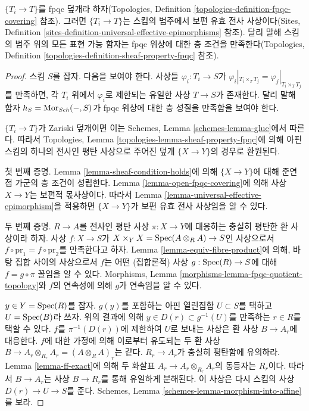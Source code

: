 \begin{lemma}
\label{lemma-fpqc-universal-effective-epimorphisms}
$\{T_i \to T\}$를 fpqc 덮개라 하자(Topologies, Definition
\ref{topologies-definition-fpqc-covering} 참조). 그러면
$\{T_i \to T\}$는 스킴의 범주에서 보편 유효 전사 사상이다(Sites,
Definition \ref{sites-definition-universal-effective-epimorphisms} 참조).
달리 말해 스킴의 범주 위의 모든 표현 가능 함자는 fpqc 위상에 대한 층 조건을
만족한다(Topologies, Definition
\ref{topologies-definition-sheaf-property-fpqc} 참조).
\end{lemma}

\begin{proof}
스킴 $S$를 잡자. 다음을 보여야 한다. 사상들 $\varphi_i : T_i \to S$가
$\varphi_i|_{T_i \times_T T_j} = \varphi_j|_{T_i \times_T T_j}$를 만족하면,
각 $T_i$ 위에서 $\varphi_i$로 제한되는 유일한 사상 $T \to S$가 존재한다.
달리 말해 함자 $h_S = \mathop{\mathrm{Mor}}\nolimits_{\mathit{Sch}}( - , S)$가 fpqc 위상에 대한 층 성질을
만족함을 보여야 한다.

\medskip\noindent
$\{T_i \to T\}$가 Zariski 덮개이면 이는 Schemes, Lemma
\ref{schemes-lemma-glue}에서 따른다. 따라서 Topologies, Lemma
\ref{topologies-lemma-sheaf-property-fpqc}에 의해 아핀 스킴의 하나의 전사인
평탄 사상으로 주어진 덮개 $\{X \to Y\}$의 경우로 환원된다.

\medskip\noindent
첫 번째 증명. Lemma \ref{lemma-sheaf-condition-holds}에 의해
$\{X \to Y\}$에 대해 준연접 가군의 층 조건이 성립한다. Lemma
\ref{lemma-open-fpqc-covering}에 의해 사상 $X \to Y$는 보편적 몫사상이다.
따라서 Lemma \ref{lemma-universal-effective-epimorphism}을 적용하면
$\{X \to Y\}$가 보편 유효 전사 사상임을 알 수 있다.

\medskip\noindent
두 번째 증명. $R \to A$를 전사인 평탄 사상 $\pi : X \to Y$에 대응하는
충실히 평탄한 환 사상이라 하자. 사상 $f : X \to S$가
$X \times_Y X = \mathop{\mathrm{Spec}}(A \otimes_R A) \to S$인 사상으로서
$f \circ \text{pr}_1 = f \circ \text{pr}_2$를 만족한다고 하자.
Lemma \ref{lemma-equiv-fibre-product}에 의해, 바탕 집합 사이의 사상으로서
$f$는 어떤 (집합론적) 사상 $g : \mathop{\mathrm{Spec}}(R) \to S$에 대해
$f = g \circ \pi$ 꼴임을 알 수 있다. Morphisms, Lemma
\ref{morphisms-lemma-fpqc-quotient-topology}와 $f$의 연속성에 의해 $g$가
연속임을 알 수 있다.

\medskip\noindent
$y \in Y = \mathop{\mathrm{Spec}}(R)$를 잡자. $g(y)$를 포함하는 아핀 열린집합
$U \subset S$를 택하고 $U = \mathop{\mathrm{Spec}}(B)$라 쓰자. 위의 결과에 의해
$y \in D(r) \subset g^{-1}(U)$를 만족하는 $r \in R$를 택할 수 있다.
$f$를 $\pi^{-1}(D(r))$에 제한하여 $U$로 보내는 사상은 환 사상
$B \to A_r$에 대응한다. $f$에 대한 가정에 의해 이로부터 유도되는 두 환
사상 $B \to A_r \otimes_{R_r} A_r = (A \otimes_R A)_r$는 같다.
$R_r \to A_r$가 충실히 평탄함에 유의하라. Lemma \ref{lemma-ff-exact}에
의해 두 화살표 $A_r \to A_r \otimes_{R_r} A_r$의 동등자는 $R_r$이다.
따라서 $B \to A_r$는 사상 $B \to R_r$를 통해 유일하게 분해된다.
이 사상은 다시 스킴의 사상 $D(r) \to U \to S$를 준다. Schemes, Lemma
\ref{schemes-lemma-morphism-into-affine}를 보라.


\end{proof}
